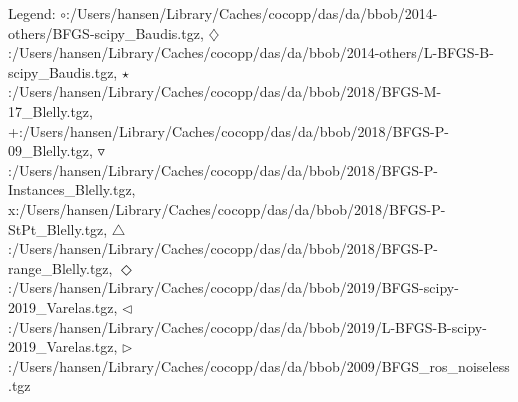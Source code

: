 Legend: {\color{CornflowerBlue}$\circ$}:/Users/hansen/Library/Caches/cocopp/das/da/bbob/2014-others/BFGS-scipy\_Baudis.tgz, {{}$\diamondsuit$}:/Users/hansen/Library/Caches/cocopp/das/da/bbob/2014-others/L-BFGS-B-scipy\_Baudis.tgz, {\color{Green}$\star$}:/Users/hansen/Library/Caches/cocopp/das/da/bbob/2018/BFGS-M-17\_Blelly.tgz, {\color{red}+}:/Users/hansen/Library/Caches/cocopp/das/da/bbob/2018/BFGS-P-09\_Blelly.tgz, {\color{brown}$\triangledown$}:/Users/hansen/Library/Caches/cocopp/das/da/bbob/2018/BFGS-P-Instances\_Blelly.tgz, {{}x}:/Users/hansen/Library/Caches/cocopp/das/da/bbob/2018/BFGS-P-StPt\_Blelly.tgz, {{}$\triangle$}:/Users/hansen/Library/Caches/cocopp/das/da/bbob/2018/BFGS-P-range\_Blelly.tgz, {{}$\Diamond$}:/Users/hansen/Library/Caches/cocopp/das/da/bbob/2019/BFGS-scipy-2019\_Varelas.tgz, {{}$\triangleleft$}:/Users/hansen/Library/Caches/cocopp/das/da/bbob/2019/L-BFGS-B-scipy-2019\_Varelas.tgz, {{}$\triangleright$}:/Users/hansen/Library/Caches/cocopp/das/da/bbob/2009/BFGS\_ros\_noiseless.tgz